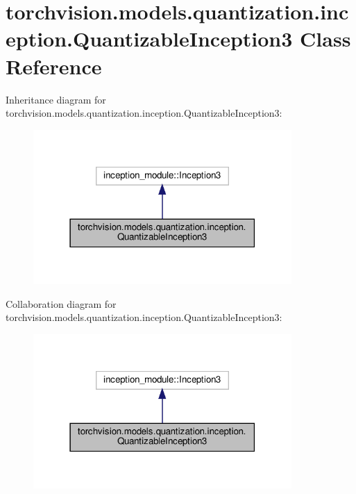 \hypertarget{classtorchvision_1_1models_1_1quantization_1_1inception_1_1QuantizableInception3}{}\section{torchvision.\+models.\+quantization.\+inception.\+Quantizable\+Inception3 Class Reference}
\label{classtorchvision_1_1models_1_1quantization_1_1inception_1_1QuantizableInception3}


Inheritance diagram for torchvision.\+models.\+quantization.\+inception.\+Quantizable\+Inception3\+:
\nopagebreak
\begin{figure}[H]
\begin{center}
\leavevmode
\includegraphics[width=279pt]{classtorchvision_1_1models_1_1quantization_1_1inception_1_1QuantizableInception3__inherit__graph}
\end{center}
\end{figure}


Collaboration diagram for torchvision.\+models.\+quantization.\+inception.\+Quantizable\+Inception3\+:
\nopagebreak
\begin{figure}[H]
\begin{center}
\leavevmode
\includegraphics[width=279pt]{classtorchvision_1_1models_1_1quantization_1_1inception_1_1QuantizableInception3__coll__graph}
\end{center}
\end{figure}
